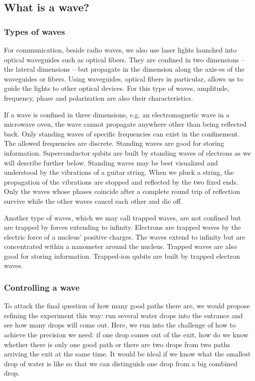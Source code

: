 \documentclass{book}
\begin{document}
\subsection{What is a wave?}

\subsubsection{Types of waves}

For communication, beside radio waves, we also use laser lights launched into optical waveguides such as optical fibers. They are confined in two dimensions -- the lateral dimensions -- but propagate in the dimension along the axis-es of the waveguides or fibers. Using waveguides, optical fibers in particular, allows us to guide the lights to other optical devices. For this type of waves, amplitude, frequency, phase and polarization are also their characteristics.

If a wave is confined in three dimensions, e.g. an electromagnetic wave in a microwave oven, the wave cannot propagate anywhere other than being reflected back. Only standing waves of specific frequencies can exist in the confinement. The allowed frequencies are discrete. Standing waves are good for storing information. Superconductor qubits are built by standing waves of electrons as we will describe further below. Standing waves may be best visualized and understood by the vibrations of a guitar string. When we pluck a string, the propagation of the vibrations are stopped and reflected by the two fixed ends. Only the waves whose phases coincide after a complete round trip of reflection survive while the other waves cancel each other and die off.

Another type of waves, which we may call trapped waves, are not confined but are trapped by forces extending to infinity. Electrons are trapped waves by the electric force of a nucleus' positive charges. The waves extend to infinity but are concentrated within a nanometer around the nucleus. Trapped waves are also good for storing information. Trapped-ion qubits are built by trapped electron waves.


\subsubsection{Controlling a wave}

To attack the final question of how many good paths there are, we would propose refining the experiment this way: run several water drops into the entrance and see how many drops will come out. Here, we run into the challenge of how to achieve the precision we need: if one drop comes out of the exit, how do we know whether there is only one good path or there are two drops from two paths arriving the exit at the same time. It would be ideal if we know what the smallest drop of water is like so that we can distinguish one drop from a big combined drop.
\end{document}
